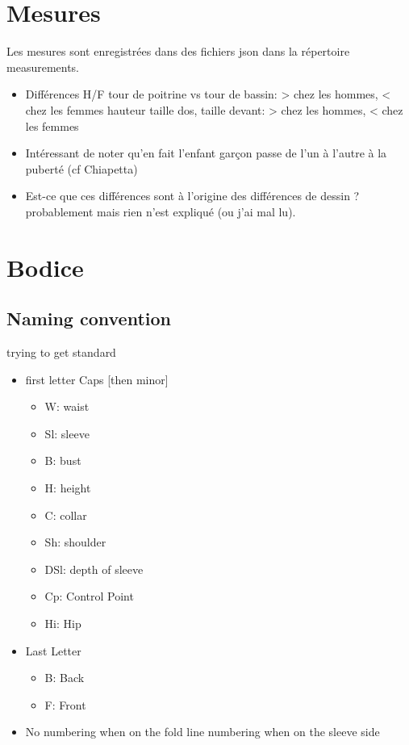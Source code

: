 \documentclass[11pt,a4paper]{article}
\begin{document}
\section{Mesures}

Les mesures sont enregistrées dans des fichiers json dans la répertoire measurements.

\begin{itemize}

\item Différences H/F
\subitem tour de poitrine vs tour de bassin: > chez les hommes, < chez les femmes
\subitem hauteur taille dos, taille devant: > chez les hommes, < chez les femmes

\item Intéressant de noter qu'en fait l'enfant garçon passe de l'un à l'autre à la puberté (cf Chiapetta)

\item Est-ce que ces différences sont à l'origine des différences de dessin ? probablement mais rien n'est expliqué (ou j'ai mal lu).
\end{itemize}


\section{Bodice}  

\subsection{Naming convention}

trying to get standard
\begin{itemize}
\item		first letter Caps [then minor]
\begin{itemize}
\item		W: waist
\item		Sl: sleeve
\item		B: bust
\item		H: height
\item		C: collar
\item		Sh: shoulder
\item		DSl: depth of sleeve
\item		Cp: Control Point
\item		Hi: Hip
\end{itemize}
		
\item		Last Letter
\begin{itemize}
\item		B: Back
\item		F: Front
\end{itemize}
		
\item		No numbering when on the fold line numbering when on the sleeve side
\end{itemize}
\end{document}

